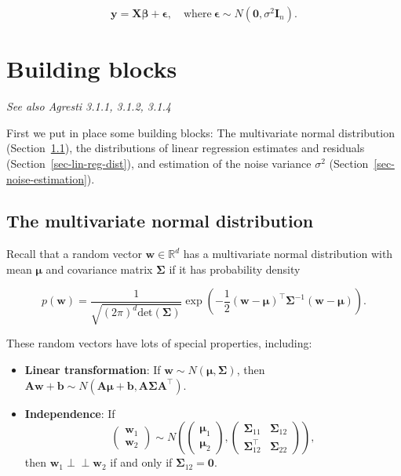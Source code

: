 \documentclass[
  11pt,
  letterpaper,
  oneside]{book}
\providecommand{\tightlist}{%
  \setlength{\itemsep}{0pt}\setlength{\parskip}{0pt}}\usepackage{longtable,booktabs,array}
\theoremstyle{definition}
\theoremstyle{plain}
\theoremstyle{plain}
\theoremstyle{plain}
\theoremstyle{remark}
\begin{document}
\[
\boldsymbol{y} = \boldsymbol{X} \boldsymbol{\beta} + \boldsymbol{\epsilon}, \quad \text{where} \ \boldsymbol{\epsilon} \sim N(\boldsymbol{0}, \sigma^2 \boldsymbol{I}_n).
\]

\hypertarget{building-blocks}{%
\chapter{Building blocks}\label{building-blocks}}

\emph{See also Agresti 3.1.1, 3.1.2, 3.1.4}

First we put in place some building blocks: The multivariate normal
distribution (Section~\ref{sec-mvrnorm}), the distributions of linear
regression estimates and residuals (Section~\ref{sec-lin-reg-dist}), and
estimation of the noise variance \(\sigma^2\)
(Section~\ref{sec-noise-estimation}).

\hypertarget{sec-mvrnorm}{%
\section{The multivariate normal distribution}\label{sec-mvrnorm}}

Recall that a random vector \(\boldsymbol{w} \in \mathbb{R}^d\) has a
multivariate normal distribution with mean \(\boldsymbol{\mu}\) and
covariance matrix \(\boldsymbol{\Sigma}\) if it has probability density

\[
p(\boldsymbol{w}) = \frac{1}{\sqrt{(2\pi)^{d}\text{det}(\boldsymbol{\Sigma})}}\exp\left(-\frac{1}{2}(\boldsymbol{w} - \boldsymbol{\mu})^\top \boldsymbol{\Sigma}^{-1}(\boldsymbol{w} - \boldsymbol{\mu})\right).
\]

These random vectors have lots of special properties, including:

\begin{itemize}
\tightlist
\item
  \textbf{Linear transformation}: If
  \(\boldsymbol{w} \sim N(\boldsymbol{\mu}, \boldsymbol{\Sigma})\), then
  \(\boldsymbol{A} \boldsymbol{w} + \boldsymbol{b} \sim N(\boldsymbol{A} \boldsymbol{\mu} + \boldsymbol{b}, \boldsymbol{A} \boldsymbol{\Sigma} \boldsymbol{A}^\top)\).
\item
  \textbf{Independence}: If \[
  \begin{pmatrix}\boldsymbol{w}_1 \\ \boldsymbol{w}_2 \end{pmatrix} \sim N\left(\begin{pmatrix}\boldsymbol{\mu}_1 \\ \boldsymbol{\mu}_2 \end{pmatrix} , \begin{pmatrix}\boldsymbol{\Sigma}_{11} & \boldsymbol{\Sigma}_{12} \\ \boldsymbol{\Sigma}_{12}^\top & \boldsymbol{\Sigma}_{22}\end{pmatrix}\right),
  \] then \(\boldsymbol{w}_1 \perp\!\!\!\perp \boldsymbol{w}_2\) if and
  only if \(\boldsymbol{\Sigma}_{12} = \boldsymbol{0}\).
\end{itemize}
\end{document}
